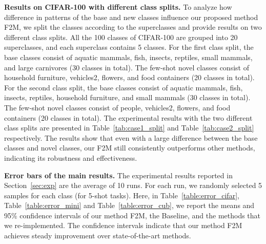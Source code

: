 \documentclass{article}
\begin{document}
\textbf{Results on CIFAR-100 with different class splits.}
To analyze how difference in patterns of the base and new classes influence our proposed method F2M, we split the classes according to the superclasses and provide results on two different class splits. All the 100 classes of CIFAR-100 are grouped into 20 superclasses, and each superclass contains 5 classes. For {the first class split}, the base classes consist of aquatic mammals, fish, insects, reptiles, small mammals, and large carnivores (30 classes in total). The few-shot novel classes consist of household furniture, vehicles2, flowers, and food containers (20 classes in total). For {the second class split}, the base classes consist of aquatic mammals, fish, insects, reptiles, household furniture, and small mammals (30 classes in total). The few-shot novel classes consist of people, vehicles2, flowers, and food containers (20 classes in total). The experimental results with the two different class splits are presented in Table~\ref{tab:case1_split} and Table~\ref{tab:case2_split} respectively. The results show that even with a large difference between the base classes and novel classes, our F2M still consistently outperforms other methods, indicating its robustness and effectiveness.

\textbf{Error bars of the main results.}
The experimental results reported in  Section~\ref{sec:exp} are the average of 10 runs. For each run, we randomly selected 5 samples for each class (for 5-shot tasks). Here, in Table~\ref{table:error_cifar}, Table~\ref{table:error_mini} and Table~\ref{table:error_cub}, we report the means and 95\% confidence intervals of our method F2M, the Baseline, and the methods that we re-implemented. The confidence intervals indicate that our method F2M achieves steady improvement over state-of-the-art methods.
\end{document}
